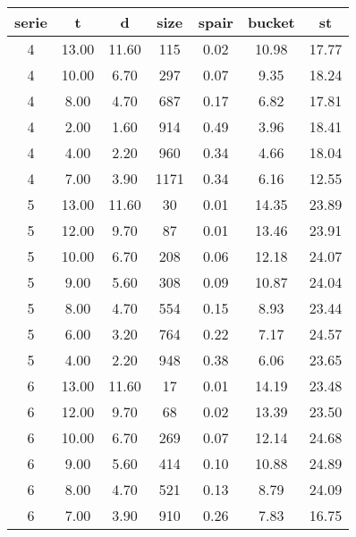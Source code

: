\begin{tabular}{|c|c|c|c|c|c|c|}
\hline
\textbf{serie} & \textbf{t} & \textbf{d} & \textbf{size} & \textbf{spair} & \textbf{bucket} & \textbf{st}\\
\hline
4 & 13.00 & 11.60 & 115 & 0.02 & 10.98 & 17.77\\
\hline
4 & 10.00 & 6.70 & 297 & 0.07 & 9.35 & 18.24\\
\hline
4 & 8.00 & 4.70 & 687 & 0.17 & 6.82 & 17.81\\
\hline
4 & 2.00 & 1.60 & 914 & 0.49 & 3.96 & 18.41\\
\hline
4 & 4.00 & 2.20 & 960 & 0.34 & 4.66 & 18.04\\
\hline
4 & 7.00 & 3.90 & 1171 & 0.34 & 6.16 & 12.55\\
\hline
5 & 13.00 & 11.60 & 30 & 0.01 & 14.35 & 23.89\\
\hline
5 & 12.00 & 9.70 & 87 & 0.01 & 13.46 & 23.91\\
\hline
5 & 10.00 & 6.70 & 208 & 0.06 & 12.18 & 24.07\\
\hline
5 & 9.00 & 5.60 & 308 & 0.09 & 10.87 & 24.04\\
\hline
5 & 8.00 & 4.70 & 554 & 0.15 & 8.93 & 23.44\\
\hline
5 & 6.00 & 3.20 & 764 & 0.22 & 7.17 & 24.57\\
\hline
5 & 4.00 & 2.20 & 948 & 0.38 & 6.06 & 23.65\\
\hline
6 & 13.00 & 11.60 & 17 & 0.01 & 14.19 & 23.48\\
\hline
6 & 12.00 & 9.70 & 68 & 0.02 & 13.39 & 23.50\\
\hline
6 & 10.00 & 6.70 & 269 & 0.07 & 12.14 & 24.68\\
\hline
6 & 9.00 & 5.60 & 414 & 0.10 & 10.88 & 24.89\\
\hline
6 & 8.00 & 4.70 & 521 & 0.13 & 8.79 & 24.09\\
\hline
6 & 7.00 & 3.90 & 910 & 0.26 & 7.83 & 16.75\\
\hline
\end{tabular}
